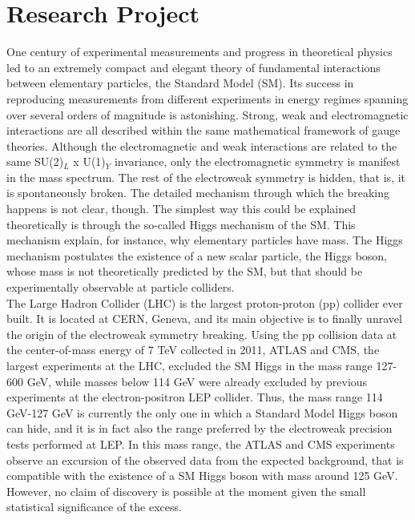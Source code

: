\documentclass[10pt, a4paper]{article}
\begin{document}
\reversemarginpar

\section*{Research Project}

One century of experimental measurements and progress in theoretical physics 
led to an extremely compact and elegant theory of fundamental interactions between 
elementary particles, the Standard Model (SM). Its success in reproducing 
measurements from different experiments in energy regimes spanning 
over several orders of magnitude is astonishing. 
Strong, weak and electromagnetic interactions are all described within the 
same mathematical framework of gauge theories. Although the electromagnetic and weak 
interactions are related to the same SU(2)$_L$ x U(1)$_Y$ invariance, only 
the electromagnetic symmetry is manifest in the mass spectrum. 
The rest of the electroweak symmetry is hidden, that is, it is spontaneously broken. 
The detailed mechanism through which the breaking happens is not clear, though. 
The simplest way this could be explained theoretically is through the 
so-called Higgs mechanism of the SM. This mechanism explain, for instance, why 
elementary particles have mass. The Higgs mechanism postulates the existence 
of a new scalar particle, the Higgs boson, whose mass is not theoretically predicted by 
the SM, but that should be experimentally observable at particle colliders. \\

The Large Hadron Collider (LHC) is the largest proton-proton (pp) collider ever built. 
It is located at CERN, Geneva, and its main objective is to finally unravel the origin 
of the electroweak symmetry breaking. Using the pp collision data at the center-of-mass energy
of 7 TeV collected in 2011, ATLAS and CMS, the 
largest experiments at the LHC, excluded the SM Higgs in the mass range 
127-600 GeV, while masses below 114 GeV were already excluded by 
previous experiments at the electron-positron LEP collider. 
Thus, the mass range 114 GeV-127 GeV is currently the only one in which 
a Standard Model Higgs boson can hide, and it is in fact also the range 
preferred by the electroweak precision tests performed at LEP. 
In this mass range, the ATLAS and CMS experiments observe an excursion of 
the observed data from the expected background, that is compatible with the existence 
of a SM Higgs boson with mass around 125 GeV. However, no claim of 
discovery is possible at the moment given the small statistical significance of the excess. 
\end{document}
